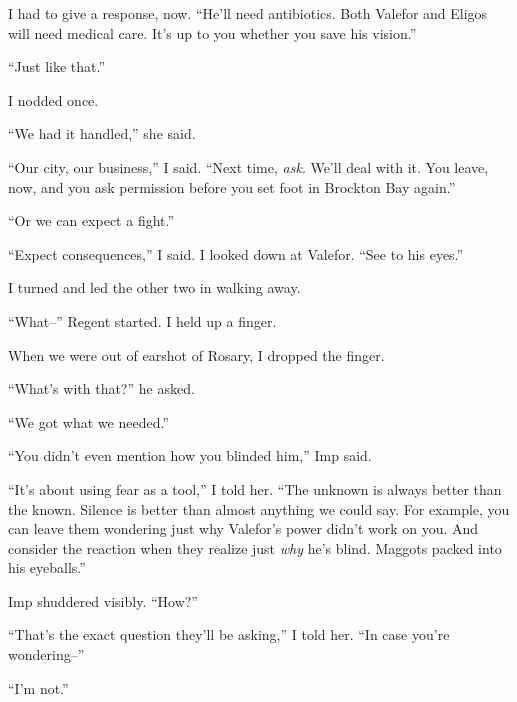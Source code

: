 I had to give a response, now.  ``He'll need antibiotics.  Both Valefor and Eligos will need medical care.  It's up to you whether you save his vision.''



``Just like that.''



I nodded once.



``We had it handled,'' she said.



``Our city, our business,'' I said.  ``Next time, \emph{ask}.  We'll deal with it.  You leave, now, and you ask permission before you set foot in Brockton Bay again.''



``Or we can expect a fight.''



``Expect consequences,'' I said.  I looked down at Valefor.  ``See to his eyes.''



I turned and led the other two in walking away.



``What--'' Regent started.  I held up a finger.



When we were out of earshot of Rosary, I dropped the finger.



``What's with that?'' he asked.



``We got what we needed.''



``You didn't even mention how you blinded him,'' Imp said.



``It's about using fear as a tool,'' I told her.  ``The unknown is always better than the known.  Silence is better than almost anything we could say.  For example, you can leave them wondering just why Valefor's power didn't work on you.  And consider the reaction when they realize just \emph{why} he's blind.  Maggots packed into his eyeballs.''



Imp shuddered visibly.  ``How?''



``That's the exact question they'll be asking,'' I told her.  ``In case you're wondering--''



``I'm not.''



